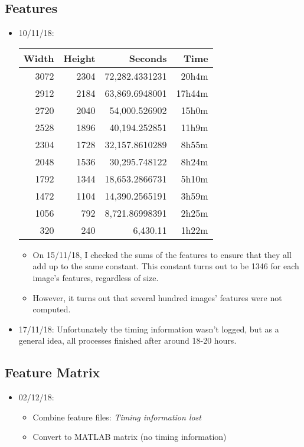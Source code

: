 \subsection{Features}
\begin{itemize}
\item 10/11/18:
  \begin{center}
  \begin{tabular}{ r r | r r }
  Width & Height & Seconds & Time \\ \hline
  3072 & 2304 & 72,282.4331231 & 20h4m \\
  2912 & 2184 & 63,869.6948001 & 17h44m \\
  2720 & 2040 & 54,000.526902 & 15h0m \\
  2528 & 1896 & 40,194.252851 & 11h9m \\
  2304 & 1728 & 32,157.8610289 & 8h55m \\
  2048 & 1536 & 30,295.748122 & 8h24m \\
  1792 & 1344 & 18,653.2866731 & 5h10m \\
  1472 & 1104 & 14,390.2565191 & 3h59m \\
  1056 & 792 & 8,721.86998391 & 2h25m \\
  320 & 240 & 6,430.11 & 1h22m \\
  \end{tabular}
  \end{center}
  \begin{itemize}
  \item On 15/11/18, I checked the sums of the features to ensure that they all add up to the same constant. This constant turns out to be 1346 for each image's features, regardless of size.
  \item However, it turns out that several hundred images' features were not computed.
  \end{itemize}
\item 17/11/18: Unfortunately the timing information wasn't logged, but as a general idea, all processes finished after around 18-20 hours.
\end{itemize}

\subsection{Feature Matrix}
\begin{itemize}
\item 02/12/18:
  \begin{itemize}
  \item Combine feature files: \textit{Timing information lost}
  \item Convert to MATLAB matrix (no timing information)
  \end{itemize}
\end{itemize}